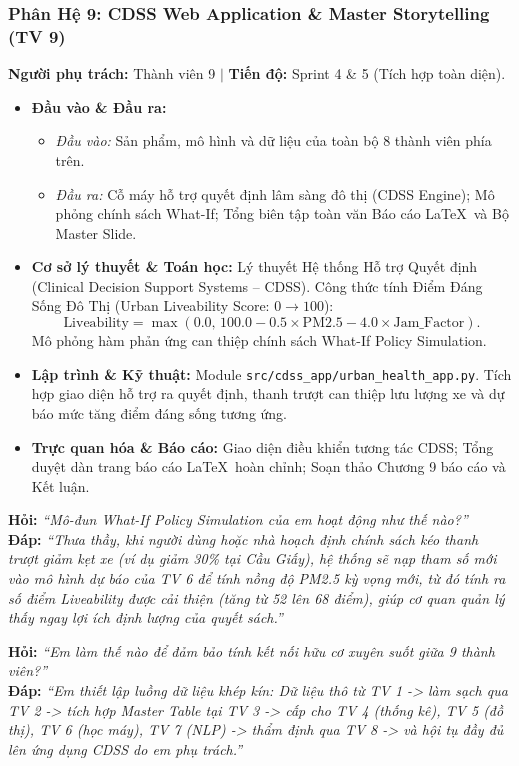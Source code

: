 \documentclass[11pt,a4paper]{article}
\begin{document}
\subsubsection{Phân Hệ 9: CDSS Web Application \& Master Storytelling (TV 9)}
\textbf{Người phụ trách:} Thành viên 9 \quad $\vert$ \quad \textbf{Tiến độ:} Sprint 4 \& 5 (Tích hợp toàn diện).
\begin{itemize}[leftmargin=*]
    \item \textbf{Đầu vào \& Đầu ra:}
    \begin{itemize}
        \item \textit{Đầu vào:} Sản phẩm, mô hình và dữ liệu của toàn bộ 8 thành viên phía trên.
        \item \textit{Đầu ra:} Cỗ máy hỗ trợ quyết định lâm sàng đô thị (CDSS Engine); Mô phỏng chính sách What-If; Tổng biên tập toàn văn Báo cáo \LaTeX\ và Bộ Master Slide.
    \end{itemize}
    \item \textbf{Cơ sở lý thuyết \& Toán học:}
    Lý thuyết Hệ thống Hỗ trợ Quyết định (Clinical Decision Support Systems -- CDSS). Công thức tính Điểm Đáng Sống Đô Thị (Urban Liveability Score: $0 \to 100$):
    \begin{equation}
        \text{Liveability} = \max\left(0.0, \, 100.0 - 0.5 \times \text{PM2.5} - 4.0 \times \text{Jam\_Factor}\right).
    \end{equation}
    Mô phỏng hàm phản ứng can thiệp chính sách What-If Policy Simulation.
    \item \textbf{Lập trình \& Kỹ thuật:} Module \texttt{src/cdss\_app/urban\_health\_app.py}. Tích hợp giao diện hỗ trợ ra quyết định, thanh trượt can thiệp lưu lượng xe và dự báo mức tăng điểm đáng sống tương ứng.
    \item \textbf{Trực quan hóa \& Báo cáo:} Giao diện điều khiển tương tác CDSS; Tổng duyệt dàn trang báo cáo \LaTeX\ hoàn chỉnh; Soạn thảo Chương 9 báo cáo và Kết luận.
\end{itemize}

\begin{tcolorbox}[colback=blue!5!white, colframe=blue!60!black, fonttitle=\bfseries\color{white}, title={BỘ CÂU HỎI VẤN ĐÁP TRỌNG TÂM DÀNH CHO TV 9}]
\textbf{Hỏi:} \textit{“Mô-đun What-If Policy Simulation của em hoạt động như thế nào?”}\\
\textbf{Đáp:} \textit{“Thưa thầy, khi người dùng hoặc nhà hoạch định chính sách kéo thanh trượt giảm kẹt xe (ví dụ giảm 30\% tại Cầu Giấy), hệ thống sẽ nạp tham số mới vào mô hình dự báo của TV 6 để tính nồng độ PM2.5 kỳ vọng mới, từ đó tính ra số điểm Liveability được cải thiện (tăng từ 52 lên 68 điểm), giúp cơ quan quản lý thấy ngay lợi ích định lượng của quyết sách.”}

\textbf{Hỏi:} \textit{“Em làm thế nào để đảm bảo tính kết nối hữu cơ xuyên suốt giữa 9 thành viên?”}\\
\textbf{Đáp:} \textit{“Em thiết lập luồng dữ liệu khép kín: Dữ liệu thô từ TV 1 -> làm sạch qua TV 2 -> tích hợp Master Table tại TV 3 -> cấp cho TV 4 (thống kê), TV 5 (đồ thị), TV 6 (học máy), TV 7 (NLP) -> thẩm định qua TV 8 -> và hội tụ đầy đủ lên ứng dụng CDSS do em phụ trách.”}
\end{tcolorbox}
\end{document}
